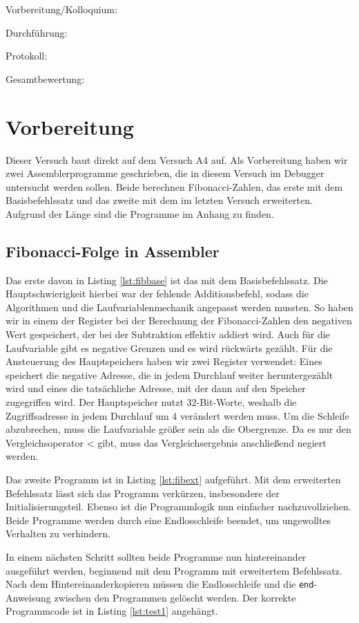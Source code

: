 \documentclass[12pt,a4paper]{scrartcl}
\begin{document}
Vorbereitung/Kolloquium:

Durchf\"uhrung:

Protokoll:

Gesamtbewertung:
\clearpage



\section{Vorbereitung}
Dieser Versuch baut direkt auf dem Versuch A4 auf.
Als Vorbereitung haben wir zwei Assemblerprogramme geschrieben, die in diesem Versuch im Debugger untersucht werden sollen.
Beide berechnen Fibonacci-Zahlen, das erste mit dem Basisbefehlssatz und das zweite mit dem im letzten Versuch erweiterten.
Aufgrund der L\"ange sind die Programme im Anhang zu finden.

\subsection*{Fibonacci-Folge in Assembler}
Das erste davon in Listing \ref{lst:fibbase} ist das mit dem Basisbefehlssatz.
Die Hauptschwierigkeit hierbei war der fehlende Additionsbefehl, sodass die Algorithmen und die Laufvariablenmechanik angepasst werden mussten.
So haben wir in einem der Register bei der Berechnung der Fibonacci-Zahlen den negativen Wert gespeichert, der bei der Subtraktion effektiv addiert wird.
Auch f\"ur die Laufvariable gibt es negative Grenzen und es wird r\"uckw\"arts gez\"ahlt.
F\"ur die Ansteuerung des Hauptspeichers haben wir zwei Register verwendet:
Eines speichert die negative Adresse, die in jedem Durchlauf weiter heruntergez\"ahlt wird und eines die tats\"achliche Adresse, mit der dann auf den Speicher zugegriffen wird.
Der Hauptspeicher nutzt 32-Bit-Worte, weshalb die Zugriffsadresse in jedem Durchlauf um 4 ver\"andert werden muss.
Um die Schleife abzubrechen, muss die Laufvariable gr\"o\ss er sein als die Obergrenze.
Da es nur den Vergleichsoperator < gibt, muss das Vergleichsergebnis anschlie\ss end negiert werden.

Das zweite Programm ist in Listing \ref{lst:fibext} aufgef\"uhrt.
Mit dem erweiterten Befehlssatz l\"asst sich das Programm verk\"urzen, insbesondere der Initialisierungsteil.
Ebenso ist die Programmlogik nun einfacher nachzuvollziehen.
Beide Programme werden durch eine Endlosschleife beendet, um ungewolltes Verhalten zu verhindern.

In einem n\"achsten Schritt sollten beide Programme nun hintereinander ausgef\"uhrt werden, beginnend mit dem Programm mit erweitertem Befehlssatz.
Nach dem Hintereinanderkopieren m\"ussen die Endlosschleife und die \texttt{end}-Anweisung zwischen den Programmen gel\"oscht werden.
Der korrekte Programmcode ist in Listing \ref{lst:test1} angeh\"angt.
\end{document}
